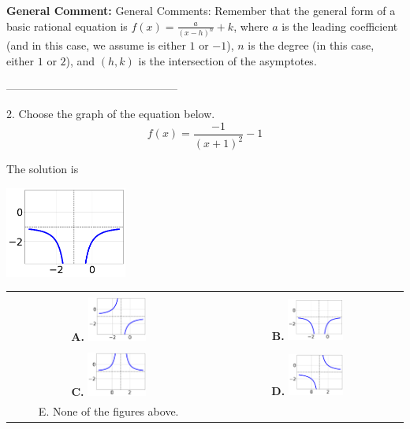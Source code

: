 \documentclass{extbook}[14pt]
\begin{document}
\textbf{General Comment:} General Comments: Remember that the general form of a basic rational equation is $ f(x) = \frac{a}{(x-h)^n} + k$, where $a$ is the leading coefficient (and in this case, we assume is either $1$ or $-1$), $n$ is the degree (in this case, either $1$ or $2$), and $(h, k)$ is the intersection of the asymptotes. 

-----------------------------------------------

2. Choose the graph of the equation below.
\[ f(x) = \frac{-1}{(x + 1)^2} - 1 \] 

 
 The solution is  
 \begin{center} \includegraphics[width=0.3\textwidth]{../Figures/rationalEquationToGraphBB.png} \end{center}\begin{tabular}{|c|c|} 
\hline 
 & \tabularnewline 
 \textbf{A.} \includegraphics[width=0.3\textwidth]{../Figures/rationalEquationToGraphAB.png} & \textbf{B.} \includegraphics[width=0.3\textwidth]{../Figures/rationalEquationToGraphBB.png} \tabularnewline 
\hline 
 & \tabularnewline 
 \textbf{C.} \includegraphics[width=0.3\textwidth]{../Figures/rationalEquationToGraphCB.png} & \textbf{D.} \includegraphics[width=0.3\textwidth]{../Figures/rationalEquationToGraphDB.png} \tabularnewline 
\hline 
 E. None of the figures above. & \tabularnewline 
\hline 
 \end{tabular} 
 
\end{document}
